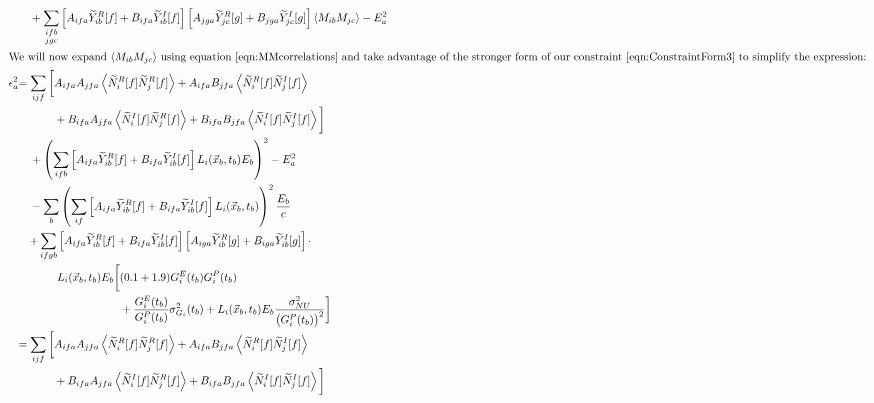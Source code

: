\begin{align*}
&\quad + \sum_{\substack{ifb\\jgc}} \left[A_{ifa} \widetilde{Y}_{ib}^R[f] + B_{ifa} \widetilde{Y}_{ib}^I[f]\right]\left[A_{jga} \widetilde{Y}_{jc}^R[g] + B_{jga} \widetilde{Y}_{jc}^I[g]\right] \left<M_{ib}M_{jc}\right> - E^2_a \\
%
\intertext{We will now expand $\left<M_{ib}M_{jc}\right>$ using equation~\ref{eqn:MMcorrelations} and take advantage of the stronger form of our constraint~\ref{eqn:ConstraintForm3} to simplify the expression:}
%
\epsilon^2_a & \begin{aligned}[t]
  = \sum_{ijf} \bigg[ & A_{ifa}A_{jfa} \left<\widetilde{N}_i^R[f]\widetilde{N}_j^R[f]\right> + A_{ifa}B_{jfa} \left<\widetilde{N}_i^R[f]\widetilde{N}_j^I[f]\right> \\
  & + B_{ifa}A_{jfa} \left<\widetilde{N}_i^I[f]\widetilde{N}_j^R[f]\right> + B_{ifa}B_{jfa} \left<\widetilde{N}_i^I[f]\widetilde{N}_j^I[f]\right>\bigg] \end{aligned} \\
&\quad + \left( \sum_{ifb} \left[A_{ifa} \widetilde{Y}_{ib}^R[f] + B_{ifa} \widetilde{Y}_{ib}^I[f]\right] L_i(\vec{x}_b,t_b) E_b \right)^2 - E^2_a \\
&\quad - \sum_b \left( \sum_{if} \left[A_{ifa} \widetilde{Y}_{ib}^R[f] + B_{ifa} \widetilde{Y}_{ib}^I[f]\right] L_i(\vec{x}_b,t_b) \right)^2 \frac{E_b}{c} \\
&\quad \begin{aligned}
  + \sum_{ifgb} &\left[A_{ifa} \widetilde{Y}_{ib}^R[f] + B_{ifa} \widetilde{Y}_{ib}^I[f]\right]\left[A_{iga} \widetilde{Y}_{ib}^R[g] + B_{iga} \widetilde{Y}_{ib}^I[g]\right] \cdot \\
  & \begin{aligned}
    L_i(\vec{x}_b,t_b) E_b \bigg[ &(0.1 + 1.9) G^E_i(t_b) G^P_i(t_b) \\
    & + \frac{G^E_i(t_b)}{G^P_i(t_b)} \sigma^2_{G_i}(t_b) + L_i(\vec{x}_b,t_b) E_b \frac{\sigma^2_{NU}}{\left(G^P_i(t_b)\right)^2} \bigg]
\end{aligned} \end{aligned} \\
%
& \begin{aligned}
  = \sum_{ijf} \bigg[ & A_{ifa}A_{jfa} \left<\widetilde{N}_i^R[f]\widetilde{N}_j^R[f]\right> + A_{ifa}B_{jfa} \left<\widetilde{N}_i^R[f]\widetilde{N}_j^I[f]\right> \\
  & + B_{ifa}A_{jfa} \left<\widetilde{N}_i^I[f]\widetilde{N}_j^R[f]\right> + B_{ifa}B_{jfa} \left<\widetilde{N}_i^I[f]\widetilde{N}_j^I[f]\right>\bigg] \end{aligned} \\

\end{align*}
